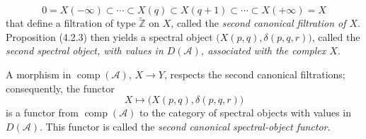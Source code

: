 \begin{equation}
0=X(-\infty)\subset\cdots\subset X(q)\subset X(q+1)
\subset\cdots\subset X(+\infty)=X
\tag{4.3.1.2}
\end{equation}
that define a filtration of type $\widetilde{\mathbb Z}$ on $X$, called
the \emph{second canonical filtration of $X$}. Proposition (4.2.3) then
yields a spectral object $\bigl(X(p,q),\delta(p,q,r)\bigr)$, called the
\emph{second spectral object, with values in $D(\mathcal A)$, associated
with the complex $X$}.

A morphism in $\operatorname{comp}(\mathcal A)$,
$X\longrightarrow Y$, respects the second canonical
filtrations; consequently, the functor
\[
X\longmapsto\bigl(X(p,q),\delta(p,q,r)\bigr)
\]
is a functor from $\operatorname{comp}(\mathcal A)$ to the category of
spectral objects with values in $D(\mathcal A)$. This functor is called the
\emph{second canonical spectral-object functor}.
\endgroup
